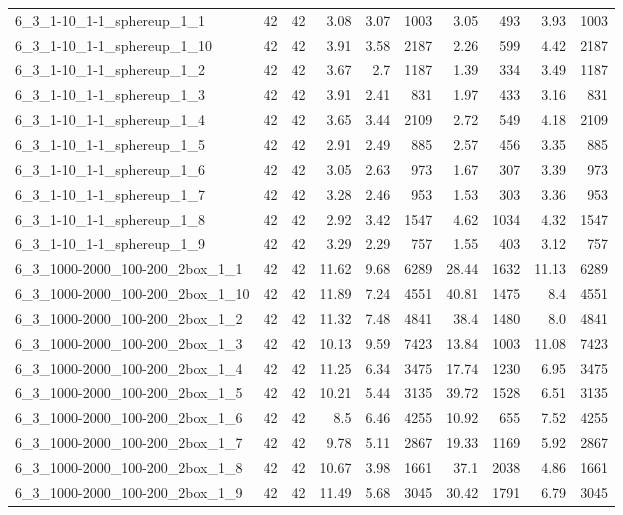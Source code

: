 \begin{center}
\begin{scriptsize}
\begin{longtable}{lrrrrrrrrr}
6\_3\_1-10\_1-1\_sphereup\_1\_1 & 42 & 42 & 3.08 & 3.07 & 1003 & 3.05 & 493 & 3.93 & 1003\\
6\_3\_1-10\_1-1\_sphereup\_1\_10 & 42 & 42 & 3.91 & 3.58 & 2187 & 2.26 & 599 & 4.42 & 2187\\
6\_3\_1-10\_1-1\_sphereup\_1\_2 & 42 & 42 & 3.67 & 2.7 & 1187 & 1.39 & 334 & 3.49 & 1187\\
6\_3\_1-10\_1-1\_sphereup\_1\_3 & 42 & 42 & 3.91 & 2.41 & 831 & 1.97 & 433 & 3.16 & 831\\
6\_3\_1-10\_1-1\_sphereup\_1\_4 & 42 & 42 & 3.65 & 3.44 & 2109 & 2.72 & 549 & 4.18 & 2109\\
6\_3\_1-10\_1-1\_sphereup\_1\_5 & 42 & 42 & 2.91 & 2.49 & 885 & 2.57 & 456 & 3.35 & 885\\
6\_3\_1-10\_1-1\_sphereup\_1\_6 & 42 & 42 & 3.05 & 2.63 & 973 & 1.67 & 307 & 3.39 & 973\\
6\_3\_1-10\_1-1\_sphereup\_1\_7 & 42 & 42 & 3.28 & 2.46 & 953 & 1.53 & 303 & 3.36 & 953\\
6\_3\_1-10\_1-1\_sphereup\_1\_8 & 42 & 42 & 2.92 & 3.42 & 1547 & 4.62 & 1034 & 4.32 & 1547\\
6\_3\_1-10\_1-1\_sphereup\_1\_9 & 42 & 42 & 3.29 & 2.29 & 757 & 1.55 & 403 & 3.12 & 757\\
6\_3\_1000-2000\_100-200\_2box\_1\_1 & 42 & 42 & 11.62 & 9.68 & 6289 & 28.44 & 1632 & 11.13 & 6289\\
6\_3\_1000-2000\_100-200\_2box\_1\_10 & 42 & 42 & 11.89 & 7.24 & 4551 & 40.81 & 1475 & 8.4 & 4551\\
6\_3\_1000-2000\_100-200\_2box\_1\_2 & 42 & 42 & 11.32 & 7.48 & 4841 & 38.4 & 1480 & 8.0 & 4841\\
6\_3\_1000-2000\_100-200\_2box\_1\_3 & 42 & 42 & 10.13 & 9.59 & 7423 & 13.84 & 1003 & 11.08 & 7423\\
6\_3\_1000-2000\_100-200\_2box\_1\_4 & 42 & 42 & 11.25 & 6.34 & 3475 & 17.74 & 1230 & 6.95 & 3475\\
6\_3\_1000-2000\_100-200\_2box\_1\_5 & 42 & 42 & 10.21 & 5.44 & 3135 & 39.72 & 1528 & 6.51 & 3135\\
6\_3\_1000-2000\_100-200\_2box\_1\_6 & 42 & 42 & 8.5 & 6.46 & 4255 & 10.92 & 655 & 7.52 & 4255\\
6\_3\_1000-2000\_100-200\_2box\_1\_7 & 42 & 42 & 9.78 & 5.11 & 2867 & 19.33 & 1169 & 5.92 & 2867\\
6\_3\_1000-2000\_100-200\_2box\_1\_8 & 42 & 42 & 10.67 & 3.98 & 1661 & 37.1 & 2038 & 4.86 & 1661\\
6\_3\_1000-2000\_100-200\_2box\_1\_9 & 42 & 42 & 11.49 & 5.68 & 3045 & 30.42 & 1791 & 6.79 & 3045\\

\end{longtable}
\end{scriptsize}
\end{center}
